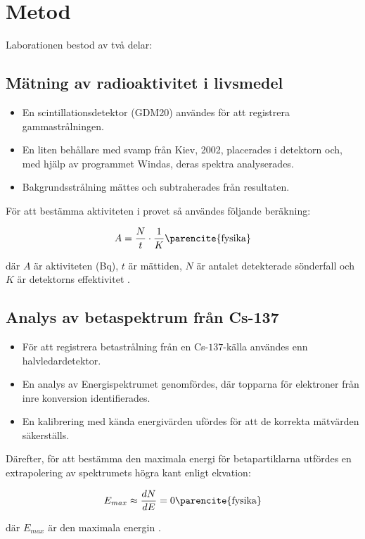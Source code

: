 \section{Metod} Laborationen bestod av två delar:

\subsection{Mätning av radioaktivitet i livsmedel}

\begin{itemize}

\item En scintillationsdetektor (GDM20) användes för att registrera gammastrålningen.

\item En liten behållare med svamp från Kiev, 2002, placerades i detektorn och, med hjälp av programmet Windas, deras spektra analyserades.

\item Bakgrundsstrålning mättes och subtraherades från resultaten.

\end{itemize}

För att bestämma aktiviteten i provet så användes följande beräkning:

\begin{equation}
A = \frac{N}{t} \cdot \frac{1}{K} \text{\parencite{fysika}}
\end{equation}

där $A$ är aktiviteten (Bq), $t$ är mättiden, $N$ är antalet detekterade sönderfall och $K$ är detektorns effektivitet \parencite{knoll}.

\subsection{Analys av betaspektrum från Cs-137}

\begin{itemize}

\item För att registrera betastrålning från en Cs-$137$-källa användes enn halvledardetektor.

\item En analys av Energispektrumet genomfördes, där topparna för elektroner från inre konversion identifierades.

\item En kalibrering med kända energivärden ufördes för att de korrekta mätvärden säkerställs.

\end{itemize}

Därefter, för att bestämma den maximala energi för betapartiklarna utfördes en extrapolering av spektrumets högra kant enligt ekvation:

\begin{equation}
E_{max} \approx \frac{dN}{dE} = 0 \text{\parencite{fysika}}
\end{equation}

där $E_{max}$ är den maximala energin \parencite{yf}.
